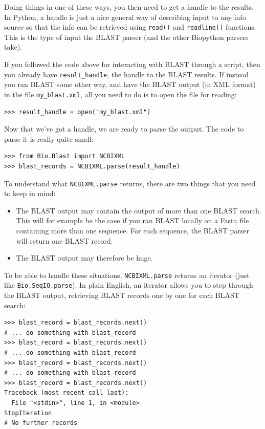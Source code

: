 \documentclass{report}
\begin{document}
Doing things in one of these ways, you then need to get a handle
to the results. In Python, a handle is just a nice general way of
describing input to any info source so that the info can be retrieved
using \verb|read()| and \verb|readline()| functions. This is the type
of input the BLAST parser (and the other Biopython parsers take). 

If you followed the code above for interacting with BLAST through a
script, then you already have \verb|result_handle|, the handle to the
BLAST results. If instead you ran BLAST some other way, and have the
BLAST output (in XML format) in the file \verb|my_blast.xml|, all you
need to do is to open the file for reading:

\begin{verbatim}
>>> result_handle = open("my_blast.xml")
\end{verbatim}

Now that we've got a handle, we are ready to parse the output. The
code to parse it is really quite small:

\begin{verbatim}
>>> from Bio.Blast import NCBIXML
>>> blast_records = NCBIXML.parse(result_handle)
\end{verbatim}

To understand what \verb|NCBIXML.parse| returns, there are two things
that you need to keep in mind:
\begin{itemize}
\item The BLAST output may contain the output of more than
one BLAST search. This will for example be the case if you ran BLAST locally
on a Fasta file containing more than one sequence. For each sequence, the
BLAST parser will return one BLAST record.
\item The BLAST output may therefore be huge.
\end{itemize}

To be able to handle these situations, \verb|NCBIXML.parse| returns an
iterator (just like \verb|Bio.SeqIO.parse|). In plain English, an iterator
allows you to step through the BLAST output, retrieving BLAST records one
by one for each BLAST search:

\begin{verbatim}
>>> blast_record = blast_records.next()
# ... do something with blast_record
>>> blast_record = blast_records.next()
# ... do something with blast_record
>>> blast_record = blast_records.next()
# ... do something with blast_record
>>> blast_record = blast_records.next()
Traceback (most recent call last):
  File "<stdin>", line 1, in <module>
StopIteration
# No further records
\end{verbatim}
\end{document}
